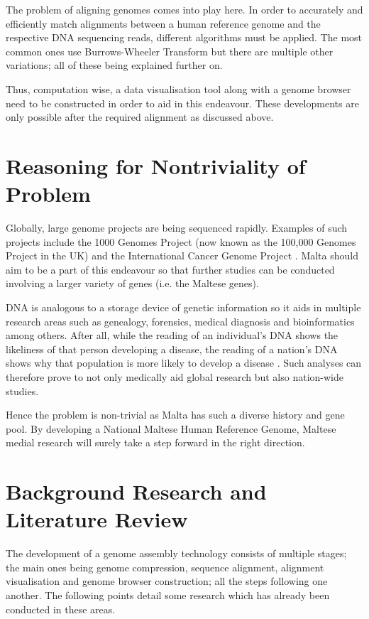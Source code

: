 \documentclass{csfyp}
\begin{document}
The problem of aligning genomes comes into play here.  In order to accurately and efficiently match alignments between a human reference genome and the respective DNA sequencing reads, different algorithms must be applied.  The most common ones use Burrows-Wheeler Transform \cite{bwtransform, cgreads} but there are multiple other variations; all of these being explained further on.  

Thus, computation wise, a data visualisation tool along with a genome browser need to be constructed in order to aid in this endeavour.  These developments are only possible after the required alignment as discussed above.  


\section{Reasoning for Nontriviality of Problem}

Globally, large genome projects are being sequenced rapidly.  Examples of such projects include the 1000 Genomes Project (now known as the 100,000 Genomes Project in the UK) and the International Cancer Genome Project \cite{bwtransform, refcompression, popgen}.  Malta should aim to be a part of this endeavour so that further studies can be conducted involving a larger variety of genes (i.e. the Maltese genes).  

DNA is analogous to a storage device of genetic information so it aids in multiple research areas such as genealogy, forensics, medical diagnosis and bioinformatics among others.  After all, while the reading of an individual's DNA shows the likeliness of that person developing a disease, the reading of a nation’s DNA shows why that population is more likely to develop a disease \cite{think}.  Such analyses can therefore prove to not only medically aid global research but also nation-wide studies.

Hence the problem is non-trivial as Malta has such a diverse history and gene pool.  By developing a National Maltese Human Reference Genome, Maltese medial research will surely take a step forward in the right direction.              


\section{Background Research and Literature Review}

The development of a genome assembly technology consists of multiple stages; the main ones being genome compression, sequence alignment, alignment visualisation and genome browser construction; all the steps following one another.  The following points detail some research which has already been conducted in these areas.
\end{document}
